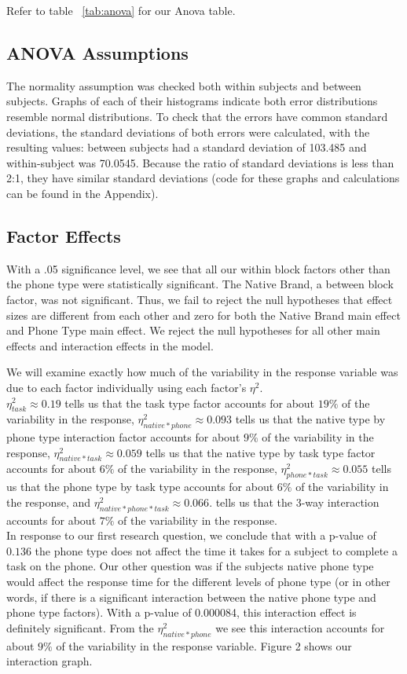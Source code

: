 \documentclass[conference]{IEEEtran}
\begin{document}
Refer to table ~\ref{tab:anova} for our Anova table. 

\subsection{ANOVA Assumptions}
The normality assumption was checked both within subjects and between subjects. Graphs of each of their histograms indicate both error distributions resemble normal distributions. To check that the errors have common standard deviations, the standard deviations of both errors were calculated, with the resulting values: between subjects had a standard deviation of 103.485 and within-subject was 70.0545. Because the ratio of standard deviations is less than 2:1, they have similar standard deviations (code for these graphs and calculations can be found in the Appendix). 

\subsection{Factor Effects}
With a .05 significance level, we see that all our within block factors other than the phone type were statistically significant. The Native Brand, a between block factor, was not significant. Thus, we fail to reject the null hypotheses that effect sizes are different from each other and zero for both the Native Brand main effect and Phone Type main effect. We reject the null hypotheses for all other main effects and interaction effects in the model. 

We will examine exactly how much of the variability in the response variable was due to each factor individually using each factor's $\eta^2$.\\
$\eta^2_{task} \approx 0.19$ tells us that the task type factor accounts for about $19\%$ of the variability in the response, $\eta^2_{native*phone} \approx 0.093$ tells us that the native type by phone type interaction factor accounts for about $9\%$ of the variability in the response, $\eta^2_{native*task} \approx 0.059$ tells us that the native type by task type factor accounts for about $6\%$ of the variability in the response, $\eta^2_{phone*task} \approx 0.055$ tells us that the phone type by task type accounts for about $6\%$ of the variability in the response, and $\eta^2_{native*phone*task} \approx 0.066$. tells us that the 3-way interaction accounts for about $7\%$ of the variability in the response.\\
In response to our first research question, we conclude that with a p-value of $0.136$ the phone type does not affect the time it takes for a subject to complete a task on the phone. Our other question was if the subjects native phone type would affect the response time for the different levels of phone type (or in other words, if there is a significant interaction between the native phone type and phone type factors). With a p-value of 0.000084, this interaction effect is definitely significant. From the $\eta^2_{native*phone}$ we see this interaction accounts for about $9\%$ of the variability in the response variable. Figure 2 shows our interaction graph. 
\end{document}

